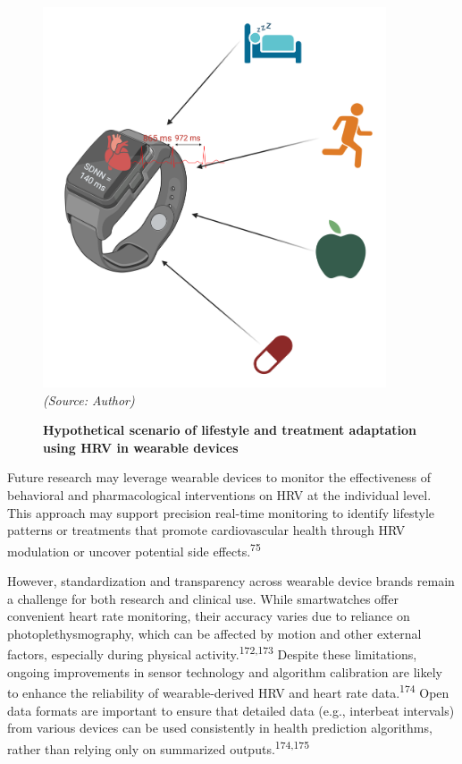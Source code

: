\documentclass[
  a4paper,
  headsepline=true,
  open=left]{scrbook}
\begin{document}
\begin{figure}

{\centering 

\includegraphics[width=4in,height=\textheight]{images/smartwatch.png}
\emph{(Source: Author)}

}

\caption{\label{fig-smw}\textbf{Hypothetical scenario of lifestyle and
treatment adaptation using HRV in wearable devices}}

\end{figure}

Future research may leverage wearable devices to monitor the
effectiveness of behavioral and pharmacological interventions on HRV at
the individual level. This approach may support precision real-time
monitoring to identify lifestyle patterns or treatments that promote
cardiovascular health through HRV modulation or uncover potential side
effects.\textsuperscript{75}

However, standardization and transparency across wearable device brands
remain a challenge for both research and clinical use. While
smartwatches offer convenient heart rate monitoring, their accuracy
varies due to reliance on photoplethysmography, which can be affected by
motion and other external factors, especially during physical
activity.\textsuperscript{172,173} Despite these limitations, ongoing
improvements in sensor technology and algorithm calibration are likely
to enhance the reliability of wearable-derived HRV and heart rate
data.\textsuperscript{174} Open data formats are important to ensure
that detailed data (e.g., interbeat intervals) from various devices can
be used consistently in health prediction algorithms, rather than
relying only on summarized outputs.\textsuperscript{174,175}
\end{document}
